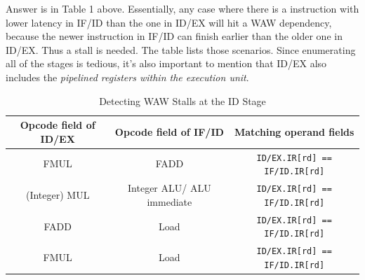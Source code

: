 \documentclass[11pt]{article}
\begin{document}
\begin{Answer}
	Answer is in Table 1 above. Essentially, any case where there is a instruction with lower latency in IF/ID than the one in ID/EX will hit a WAW dependency, because the newer instruction in IF/ID can finish earlier than the older one in ID/EX. Thus a stall is needed. The table lists those scenarios. Since enumerating all of the stages is tedious, it's also important to mention that ID/EX also includes the
	\textit{pipelined registers within the execution unit}.
\end{Answer}

\begin{table}
	\caption{Detecting WAW Stalls at the ID Stage} %
	\centering %
	\begin{tabular}{c c c} %
		\hline\hline %
		Opcode field of ID/EX & Opcode field of IF/ID      & Matching operand fields             \\ [0.5ex] %
		\hline %
		FMUL                  & FADD                       & \verb|ID/EX.IR[rd] == IF/ID.IR[rd]| \\
		(Integer) MUL         & Integer ALU/ ALU immediate & \verb|ID/EX.IR[rd] == IF/ID.IR[rd]| \\
		FADD                  & Load                       & \verb|ID/EX.IR[rd] == IF/ID.IR[rd]| \\
		FMUL                  & Load                       & \verb|ID/EX.IR[rd] == IF/ID.IR[rd]| \\
		[1ex] %
		\hline %
	\end{tabular}
	\label{table:nonlin} %
\end{table}







\newpage
\end{document}
